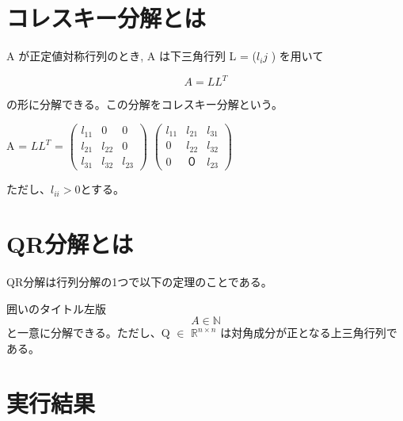 \documentclass[titlepage, a4paper, 11pt, dvipdfmx]{jsarticle}
\begin{document}
    \section{コレスキー分解とは}
    A が正定値対称行列のとき, A は下三角行列 L = ($l_ij$ ) を用いて

    $$ A=LL^T $$

    の形に分解できる。この分解をコレスキー分解という。

A =  $LL^T$ = \(
        \left(
        \begin{array}{ccc}
        l_{11} & 0 & 0 \\
        l_{21} & l_{22} & 0 \\
        l_{31} & l_{32} & l_{23}
        \end{array}
        \right)
        \)
       \(
            \left(
            \begin{array}{ccc}
            l_{11} & l_{21} & l_{31} \\
            0 & l_{22} & l_{32} \\
            0 & ０ & l_{23}
            \end{array}
            \right)
    \)

        ただし、$l_{ii}>0$とする。

\section{QR分解とは}
QR分解は行列分解の1つで以下の定理のことである。

\begin{itembox}[l]{囲いのタイトル左版}
    \begin{equation}
        A \in \mathbb{N}
    \end{equation}
    と一意に分解できる。ただし、Q $\in$ $\mathbb{R}^{n \times n} $ は対角成分が正となる上三角行列である。
\end{itembox}


\section{実行結果}
\end{document}
